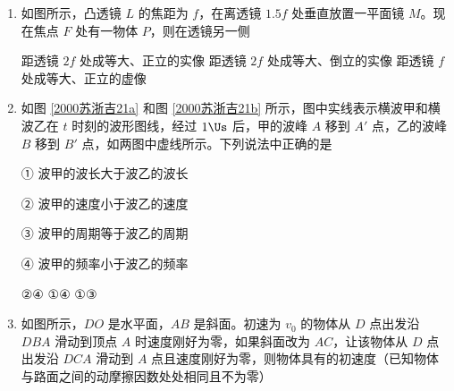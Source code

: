 \documentclass[\gkver]{gaokaozhenti}
\begin{document}
\begin{enumerate}
\item
如图所示，凸透镜 $L$ 的焦距为 $f$，在离透镜 $1.5f$ 处垂直放置一平面镜 $M$。现在焦点 $F$ 处有一物体 $P$，则在透镜另一侧 


{距透镜 $2f$ 处成等大、正立的实像}
{距透镜 $2f$ 处成等大、倒立的实像}
{距透镜 $f$ 处成等大、正立的虚像}


\item
如图 \ref{2000苏浙吉21a} 和图 \ref{2000苏浙吉21b} 所示，图中实线表示横波甲和横波乙在 $t$ 时刻的波形图线，经过 $1\Us$ 后，甲的波峰 $A$ 移到 $A'$ 点，乙的波峰 $B$ 移到 $B'$ 点，如两图中虚线所示。下列说法中正确的是 

① 波甲的波长大于波乙的波长

② 波甲的速度小于波乙的速度

③ 波甲的周期等于波乙的周期

④ 波甲的频率小于波乙的频率


{②④}
{①④}
{①③}


\item
如图所示，$DO$ 是水平面，$AB$ 是斜面。初速为 $v_{0}$ 的物体从 $D$ 点出发沿 $DBA$ 滑动到顶点 $A$ 时速度刚好为零，如果斜面改为 $AC$，让该物体从 $D$ 点出发沿 $DCA$ 滑动到 $A$ 点且速度刚好为零，则物体具有的初速度（已知物体与路面之间的动摩擦因数处处相同且不为零） 


\end{enumerate}
\end{document}
